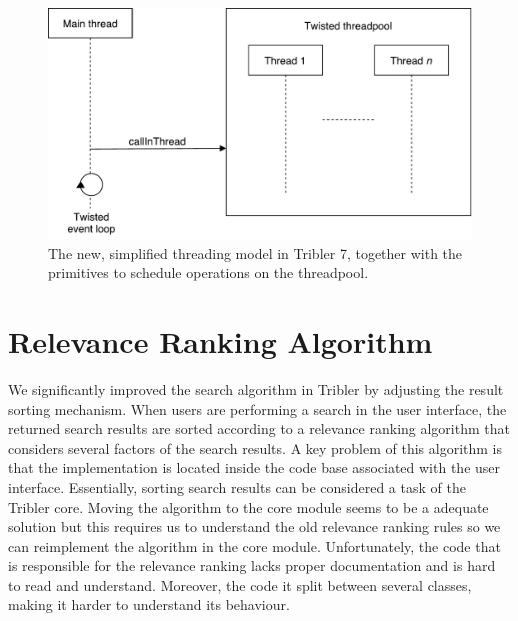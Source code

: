 \begin{figure}[h!]
	\centering
	\includegraphics[width=0.7\columnwidth]{images/improving_qa/new_threading_model_tribler}
	\caption{The new, simplified threading model in Tribler 7, together with the primitives to schedule operations on the threadpool.}
	\label{fig:new-threading-model}
\end{figure}

\section{Relevance Ranking Algorithm}
\label{sec:relevance-ranking-algorithm}
We significantly improved the search algorithm in Tribler by adjusting the result sorting mechanism. When users are performing a search in the user interface, the returned search results are sorted according to a relevance ranking algorithm that considers several factors of the search results. A key problem of this algorithm is that the implementation is located inside the code base associated with the user interface. Essentially, sorting search results can be considered a task of the Tribler core. Moving the algorithm to the core module seems to be a adequate solution but this requires us to understand the old relevance ranking rules so we can reimplement the algorithm in the core module. Unfortunately, the code that is responsible for the relevance ranking lacks proper documentation and is hard to read and understand. Moreover, the code it split between several classes, making it harder to understand its behaviour.

